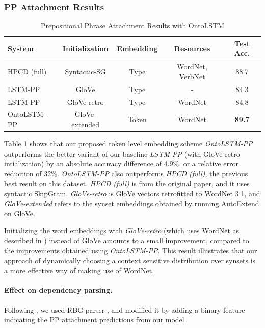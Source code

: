 \subsubsection{PP Attachment Results}
\begin{table}
    \centering
    \begin{tabular}{|l|c|c|c|c|}
    \hline
    \textbf{System} & \textbf{Initialization} & \textbf{Embedding} & \textbf{Resources} & \textbf{Test Acc.}\\
    \hline
    HPCD (full) & Syntactic-SG & Type & WordNet, VerbNet & 88.7 \\
    \hline
    LSTM-PP  & GloVe & Type & - & 84.3 \\
    LSTM-PP & GloVe-retro & Type & WordNet & 84.8 \\
    OntoLSTM-PP & GloVe-extended & Token & WordNet & \textbf{89.7} \\
    \hline
    \end{tabular}
    \caption{Prepositional Phrase Attachment Results with OntoLSTM}
    \label{tab:ontolstm_direct_ppa_results}
\end{table}
Table \ref{tab:ontolstm_direct_ppa_results} shows that our proposed token level embedding scheme \textit{OntoLSTM-PP} outperforms the better variant of our baseline \textit{LSTM-PP} (with GloVe-retro intialization) by an absolute accuracy difference of 4.9\%, 
or a relative error reduction of 32\%.
\textit{OntoLSTM-PP} also outperforms \textit{HPCD (full)}, the previous best result on this dataset. \textit{HPCD (full)} is from the original paper, and it uses syntactic SkipGram. \textit{GloVe-retro} is GloVe vectors retrofitted \citep{faruqui:15} to WordNet 3.1, and \textit{GloVe-extended} refers to the synset embeddings obtained by running AutoExtend \citep{rothe:15} on GloVe.

Initializing the word embeddings with \textit{GloVe-retro} (which uses WordNet as described in \cite{faruqui:15}) instead of GloVe amounts to a small improvement, compared to the improvements obtained using \textit{OntoLSTM-PP}.
This result illustrates that our approach of dynamically choosing a context sensitive distribution over synsets is a more effective way of making use of WordNet.


\paragraph{Effect on dependency parsing.} Following \cite{belinkov2014exploring}, we used RBG parser \citep{lei2014low}, and modified it by adding a binary feature indicating the PP attachment predictions from our model. 

